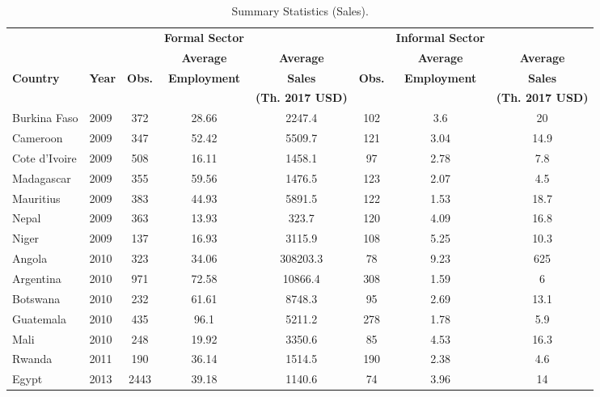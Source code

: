 \documentclass[letterpaper, 12pt]{article}
\begin{document}
\begin{table}[ht!]
    \caption{Summary Statistics (Sales).}
    \label{tab_sales}
\scriptsize
    \centering
    \begin{tabular}{ll|ccc|ccc}
     &  & & \textbf{Formal Sector} & & & \textbf{Informal Sector} & \\
     & &  & \textbf{Average} & \textbf{Average} &  & \textbf{Average} & \textbf{Average} \\
     \textbf{Country}& \textbf{Year} & \textbf{Obs.} & \textbf{Employment} & \textbf{Sales} & \textbf{Obs.} & \textbf{Employment} & \textbf{Sales} \\
        & & &  & \textbf{(Th. 2017 USD)} &  &  & \textbf{(Th. 2017 USD)} \\
\hline
\hline
Burkina Faso & 2009 & 372 & 28.66 & 2247.4 & 102 & 3.6 & 20 \\
Cameroon & 2009 & 347 & 52.42 & 5509.7 & 121 & 3.04 & 14.9 \\
Cote d'Ivoire & 2009 & 508 & 16.11 & 1458.1 & 97 & 2.78 & 7.8 \\
Madagascar & 2009 & 355 & 59.56 & 1476.5 & 123 & 2.07 & 4.5 \\
Mauritius & 2009 & 383 & 44.93 & 5891.5 & 122 & 1.53 & 18.7 \\
Nepal & 2009 & 363 & 13.93 & 323.7 & 120 & 4.09 & 16.8 \\
Niger & 2009 & 137 & 16.93 & 3115.9 & 108 & 5.25 & 10.3 \\
Angola & 2010 & 323 & 34.06 & 308203.3 & 78 & 9.23 & 625 \\
Argentina & 2010 & 971 & 72.58 & 10866.4 & 308 & 1.59 & 6 \\
Botswana & 2010 & 232 & 61.61 & 8748.3 & 95 & 2.69 & 13.1 \\
Guatemala & 2010 & 435 & 96.1 & 5211.2 & 278 & 1.78 & 5.9 \\
Mali & 2010 & 248 & 19.92 & 3350.6 & 85 & 4.53 & 16.3 \\
Rwanda & 2011 & 190 & 36.14 & 1514.5 & 190 & 2.38 & 4.6 \\
Egypt & 2013 & 2443 & 39.18 & 1140.6 & 74 & 3.96 & 14 \\

\end{tabular}
\end{table}
\end{document}
